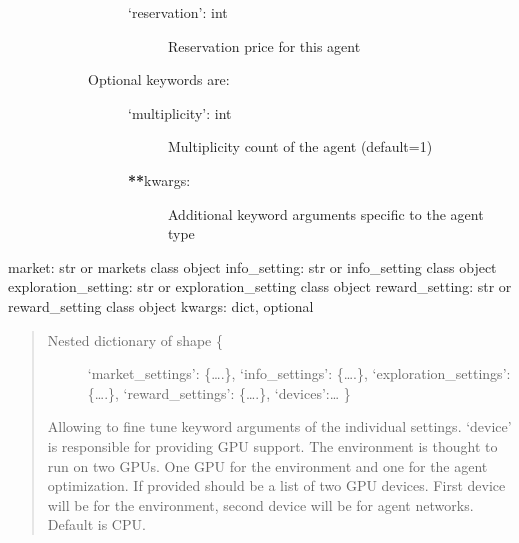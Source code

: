 \documentclass[letterpaper,10pt,english]{sphinxmanual}
\begin{document}
\begin{fulllineitems}
\begin{fulllineitems}
\begin{description}
\begin{description}
\begin{description}
\begin{description}
\item[{‘reservation’: int}] \leavevmode
\sphinxAtStartPar
Reservation price for this agent

\end{description}

\item[{Optional keywords are:}] \leavevmode\begin{description}
\item[{‘multiplicity’: int}] \leavevmode
\sphinxAtStartPar
Multiplicity count of the agent (default=1)

\item[{{\color{red}\bfseries{}**}kwargs:}] \leavevmode
\sphinxAtStartPar
Additional keyword arguments specific to the agent type

\end{description}

\end{description}

\end{description}

\end{description}

\sphinxAtStartPar
market: str or markets class object
info\_setting: str or info\_setting class object
exploration\_setting: str or exploration\_setting class object
reward\_setting: str or reward\_setting class object
kwargs: dict, optional
\begin{quote}
\begin{description}
\item[{Nested dictionary of shape \{}] \leavevmode
\sphinxAtStartPar
‘market\_settings’: \{….\},
‘info\_settings’: \{….\},
‘exploration\_settings’: \{….\},
‘reward\_settings’: \{….\},
‘devices’:…
\}

\end{description}

\sphinxAtStartPar
Allowing to fine tune keyword arguments of the individual settings.
‘device’ is responsible for providing GPU support.
The environment is thought to run on two GPUs. One GPU for the environment and one for the
agent optimization. If provided should be a list of two GPU devices.
First device will be for the environment, second device will be for agent networks.
Default is CPU.
\end{quote}

\end{fulllineitems}



\end{fulllineitems}
\end{document}
